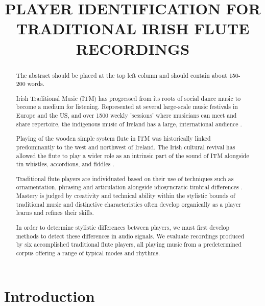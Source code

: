 \documentclass{article}
\title{PLAYER IDENTIFICATION FOR TRADITIONAL IRISH FLUTE RECORDINGS}
\begin{document}
%
\maketitle
%
\begin{abstract}

The abstract should be placed at the top left column and should contain about 150-200 words.

Irish Traditional Music (ITM) has progressed from its roots of social dance music to become a medium for listening. Represented at several large-scale music festivals in Europe and the US, and over 1500 weekly 'sessions' where musicians can meet and share repertoire, the indigenous music of Ireland has a large, international audience \cite{vallely_companion_2011}. 

Playing of the wooden simple system flute  in ITM was historically linked predominantly to the west and northwest of Ireland. The Irish cultural revival has allowed the flute to play a wider role as an intrinsic part of the sound of ITM alongside tin whistles, accordions, and fiddles \cite{williams_irish_2010}. 



 Traditional flute players are individuated based on their use of techniques such as ornamentation, phrasing and articulation 
\cite{mccullough_style_1977,hast_music_2004, keegan_parameters_2010, larsen_essential_2003} alongside idiosyncratic timbral differences \cite{ali-maclachlan_quantifying_2013, widholm_silver_2001, ali-maclachlan_towards_2015}. Mastery is judged by creativity and technical ability within the stylistic bounds of traditional music and distinctive characteristics often develop organically as a player learns and refines their skills.  

In order to determine stylistic differences between players, we must first develop methods to detect these differences in audio signals. We evaluate recordings produced by six accomplished traditional flute players, all playing music from a predetermined corpus offering a range of typical modes and rhythms.


\end{abstract}
%
\section{Introduction}\label{sec:introduction}
\end{document}
